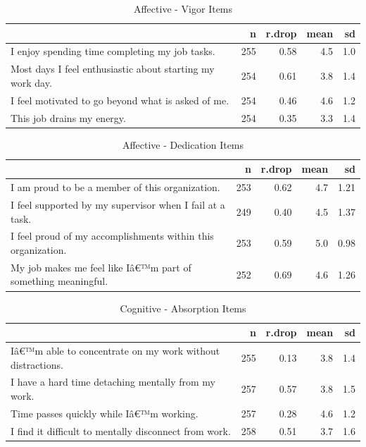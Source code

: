 \documentclass[
]{book}
\begin{document}
\begin{table}

\caption{\label{tab:rdrop8}Affective - Vigor Items}
\centering
\begin{tabular}[t]{l|r|r|r|r}
\hline
  & n & r.drop & mean & sd\\
\hline
I enjoy spending time completing my job tasks. & 255 & 0.58 & 4.5 & 1.0\\
\hline
Most days I feel enthusiastic about starting my work day. & 254 & 0.61 & 3.8 & 1.4\\
\hline
I feel motivated to go beyond what is asked of me. & 254 & 0.46 & 4.6 & 1.2\\
\hline
This job drains my energy. & 254 & 0.35 & 3.3 & 1.4\\
\hline
\end{tabular}
\end{table}

\begin{table}

\caption{\label{tab:rdrop9}Affective - Dedication Items}
\centering
\begin{tabular}[t]{l|r|r|r|r}
\hline
  & n & r.drop & mean & sd\\
\hline
I am proud to be a member of this organization. & 253 & 0.62 & 4.7 & 1.21\\
\hline
I feel supported by my supervisor when I fail at a task. & 249 & 0.40 & 4.5 & 1.37\\
\hline
I feel proud of my accomplishments within this organization. & 253 & 0.59 & 5.0 & 0.98\\
\hline
My job makes me feel like Iâ€™m part of something meaningful. & 252 & 0.69 & 4.6 & 1.26\\
\hline
\end{tabular}
\end{table}

\begin{table}

\caption{\label{tab:rdrop10}Cognitive - Absorption Items}
\centering
\begin{tabular}[t]{l|r|r|r|r}
\hline
  & n & r.drop & mean & sd\\
\hline
Iâ€™m able to concentrate on my work without distractions. & 255 & 0.13 & 3.8 & 1.4\\
\hline
I have a hard time detaching mentally from my work. & 257 & 0.57 & 3.8 & 1.5\\
\hline
Time passes quickly while Iâ€™m working. & 257 & 0.28 & 4.6 & 1.2\\
\hline
I find it difficult to mentally disconnect from work. & 258 & 0.51 & 3.7 & 1.6\\
\hline
\end{tabular}
\end{table}
\end{document}
